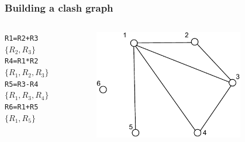 \documentclass{beamer}
\begin{document}
\begin{frame}[containsverbatim]
\frametitle{Building a clash graph}
\begin{columns}[c]
\begin{alltt}
R1 = R2 + R3  \(\{R_2, R_3\}\)
R4 = R1 * R2  \(\{R_1, R_2, R_3\}\)
R5 = R3 - R4  \(\{R_1, R_3, R_4\}\)
R6 = R1 + R5  \(\{R_1, R_5\}\)
\end{alltt}
\begin{figure}[!ht]
  \centering
  \includegraphics[width=0.8\textwidth]{graph.pdf}
\end{figure}
\end{columns}
\end{frame}
\end{document}
